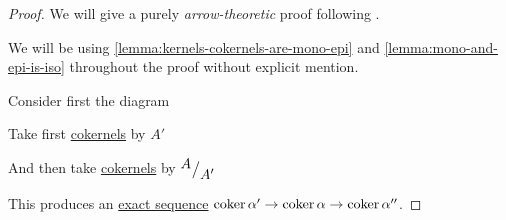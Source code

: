 \documentclass[../../../main]{subfiles}
\begin{document}
\begin{proof}
  We will give a purely \textit{arrow-theoretic} proof following \cite{wiseNONELEMENTARYPROOFSNAKEa}.

  We will be using \autoref{lemma:kernels-cokernels-are-mono-epi} and \autoref{lemma:mono-and-epi-is-iso} throughout the proof without explicit mention.

  Consider first the diagram
  \begin{center}
  \end{center}

  Take first \hyperref[def:categorical-cokernel]{cokernels} by \(A'\)
  \begin{center}
  \end{center}
  And then take \hyperref[def:categorical-cokernel]{cokernels} by \({^{\textstyle A}\big/_{\textstyle A'}}\)
  \begin{center}
  \end{center}
  This produces an \hyperref[def:exact-complex]{exact sequence} \(\operatorname*{coker} \alpha' \to \operatorname*{coker} \alpha \to \operatorname*{coker} \alpha''\).


\end{proof}
\end{document}
